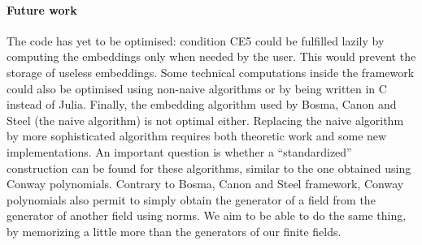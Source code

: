 \documentclass[12pt]{article}
\begin{document}
\paragraph{Future work}

The code has yet to be optimised: condition CE5 could be fulfilled lazily by
computing the embeddings only when needed by the user. This would prevent the
storage of useless embeddings. Some technical computations inside the framework could also be optimised
using non-naive algorithms or by being written in C instead of Julia. Finally,
the embedding algorithm used by Bosma,
Canon and Steel (the naive algorithm) is not optimal either. Replacing the naive
algorithm by more sophisticated algorithm requires both theoretic work and some
new implementations. An important question is whether a ``standardized''
construction can be found for these algorithms, similar to the one obtained
using Conway polynomials. Contrary to Bosma, Canon and Steel framework, Conway
polynomials also permit to simply obtain the generator of a field from the
generator of another field using norms. We aim to be able to do the same thing,
by memorizing a little more than the generators of our finite fields.



\end{document}

